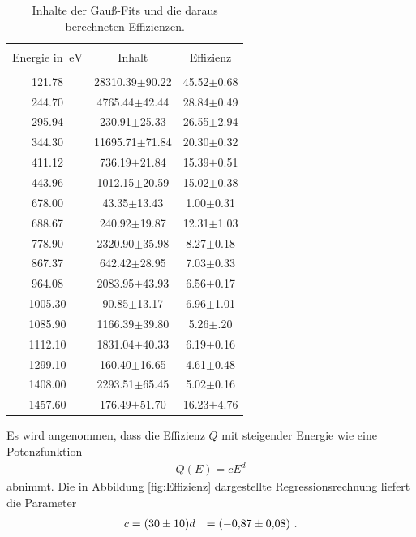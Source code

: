 \begin{table}
\centering
\caption{Inhalte der Gauß-Fits und die daraus berechneten Effizienzen.}
\begin{tabular}{c c c}
\hline \\
Energie in $\SI{}{\electronvolt}$ & Inhalt & Effizienz\\
\hline \\
121.78 & 28310.39$\pm$90.22 & 45.52$\pm$0.68 \\ 244.70 & 4765.44$\pm$42.44 & 28.84$\pm$0.49 \\ 295.94 & 230.91$\pm$25.33 & 26.55$\pm$2.94 \\ 344.30 & 11695.71$\pm$71.84 & 20.30$\pm$0.32 \\ 411.12 & 736.19$\pm$21.84 & 15.39$\pm$0.51 \\ 443.96 & 1012.15$\pm$20.59 & 15.02$\pm$0.38 \\ 678.00 & 43.35$\pm$13.43 & 1.00$\pm$0.31 \\ 688.67 & 240.92$\pm$19.87 & 12.31$\pm$1.03 \\ 778.90 & 2320.90$\pm$35.98 & 8.27$\pm$0.18 \\ 867.37 & 642.42$\pm$28.95 & 7.03$\pm$0.33 \\ 964.08 & 2083.95$\pm$43.93 & 6.56$\pm$0.17 \\ 1005.30 & 90.85$\pm$13.17 & 6.96$\pm$1.01 \\ 1085.90 & 1166.39$\pm$39.80 & 5.26$\pm$.20 \\ 1112.10 & 1831.04$\pm$40.33 & 6.19$\pm$0.16 \\ 1299.10 & 160.40$\pm$16.65 & 4.61$\pm$0.48 \\ 1408.00 & 2293.51$\pm$65.45 & 5.02$\pm$0.16 \\ 1457.60 & 176.49$\pm$51.70 & 16.23$\pm$4.76\\
\hline
\end{tabular}
\label{tab:atab2}
\end{table}
Es wird angenommen, dass die Effizienz $Q$ mit steigender Energie wie eine Potenzfunktion
\begin{align}
Q(E)=c E^{d}
\end{align}
abnimmt.
Die in Abbildung \ref{fig:Effizienz} dargestellte Regressionsrechnung liefert die Parameter
\begin{align*}
c&=\SI{30+-10}{}
d&=\SI{-0.87+-0.08}{}\text{ .}
\end{align*}
